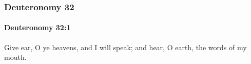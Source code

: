 	\subsubsection{Deuteronomy 32} %
		\label{DEUTERONOMY-32}

		\paragraph{Deuteronomy 32:1} %
			\label{DEUTERONOMY-32-1}

			Give ear, O ye heavens, and I will speak; and hear, O earth, the words of my mouth.


